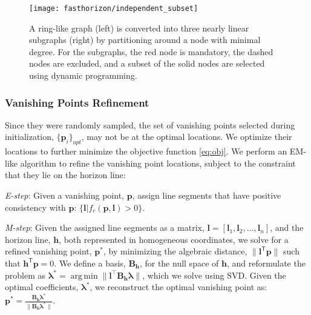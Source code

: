 \begin{figure}
  \centering
  \texttt{[image: fasthorizon/independent\_subset]}

  \caption{A ring-like graph (left) is converted into three nearly
    linear subgraphs (right) by partitioning around a node with
    minimal degree. For the subgraphs, the red node is mandatory, the
    dashed nodes are excluded, and a subset of the solid nodes are
    selected using dynamic programming.}

  \label{fig:subset}
\end{figure}

\subsubsection{Vanishing Points Refinement}
\label{sec:refinement}

Since they were randomly sampled, the set of vanishing points
selected during initialization, $\{\mathbf{p}_i\}_{opt}$, may not be at the
optimal locations.  We optimize their locations to further minimize
the objective function \eqref{eq:obj}. We perform an EM-like algorithm
to refine the vanishing point locations, subject to the constraint
that they lie on the horizon line:
\begin{compactitem}

\item \emph{E-step}: Given a vanishing point, $\mathbf{p}$, assign
  line segments that have positive consistency with $\mathbf{p}$:
  $\{\mathbf{l}|f_c(\mathbf{p},\mathbf{l}) > 0\}$.
\item \emph{M-step}: Given the assigned line segments as a matrix,
  $\mathbf{l} = [\mathbf{l}_1, \mathbf{l}_2,\dots ,\mathbf{l}_n]$, and the horizon line,
  $\mathbf{h}$, both represented in homogeneous coordinates, we 
  solve for a refined vanishing point, $\mathbf{p}^*$, by minimizing the algebraic distance, $\|
  \mathbf{l}^\mathsf{T} \mathbf{p} \|$ such that $\mathbf{h}^\mathsf{T} \mathbf{p} = 0$. We define a
  basis, $\mathbf{B}_\mathbf{h}$, for the null space of $\mathbf{h}$, and reformulate
  the problem as $\mathbf{\lambda}^* = \operatorname*{arg\,min} \|
  \mathbf{l}^\top \mathbf{B}_\mathbf{h} \mathbf{\lambda} \|$, which we solve using SVD.
  Given the optimal coefficients, $\mathbf{\lambda}^*$, we reconstruct
  the optimal vanishing point as: $\mathbf{p}^* =
  \frac{\mathbf{B}_\mathbf{h}\mathbf{\lambda}^*}
  {\|\mathbf{B}_\mathbf{h}\mathbf{\lambda}^*\|}$.

\end{compactitem}

